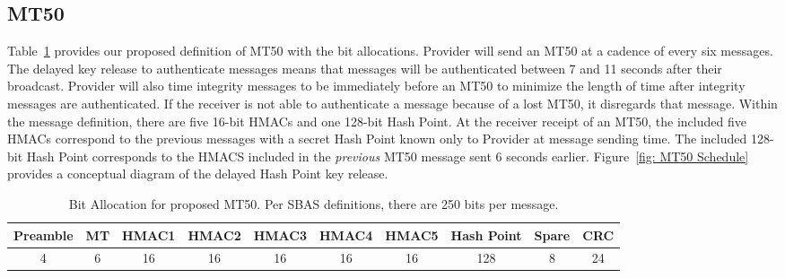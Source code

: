 \documentclass[letterpaper,times]{IONconf/IONconf}
\begin{document}
	\subsection{MT50} \label{sub:mt50}

		Table~\ref{tab: mt50} provides our proposed definition of MT50 with the bit allocations.
		Provider will send an MT50 at a cadence of every six messages.
		The delayed key release to authenticate messages means that messages will be authenticated between 7 and 11 seconds after their broadcast.
		Provider will also time integrity messages to be immediately before an MT50 to minimize the length of time after integrity messages are authenticated.
		If the receiver is not able to authenticate a message because of a lost MT50, it disregards that message.
		Within the message definition, there are five 16-bit HMACs and one 128-bit Hash Point.
		At the receiver receipt of an MT50, the included five HMACs correspond to the previous messages with a secret Hash Point known only to Provider at message sending time.
		The included 128-bit Hash Point corresponds to the HMACS included in the {\em previous} MT50 message sent 6 seconds earlier.
		Figure~\ref{fig: MT50 Schedule} provides a conceptual diagram of the delayed Hash Point key release.

		\begin{table}%
			\center
			\begin{tabular}{|c|c|c|c|c|c|c|c|c|c|} \hline
				Preamble & MT & HMAC1 & HMAC2 & HMAC3 & HMAC4 & HMAC5 & Hash Point & Spare & CRC \\ \hline
				4 & 6 & 16 & 16 & 16 & 16 & 16 & 128 & 8 & 24 \\ \hline
			\end{tabular}
			\caption{Bit Allocation for proposed MT50. Per SBAS definitions, there are 250 bits per message.}
			\label{tab: mt50}
		\end{table}
\end{document}
